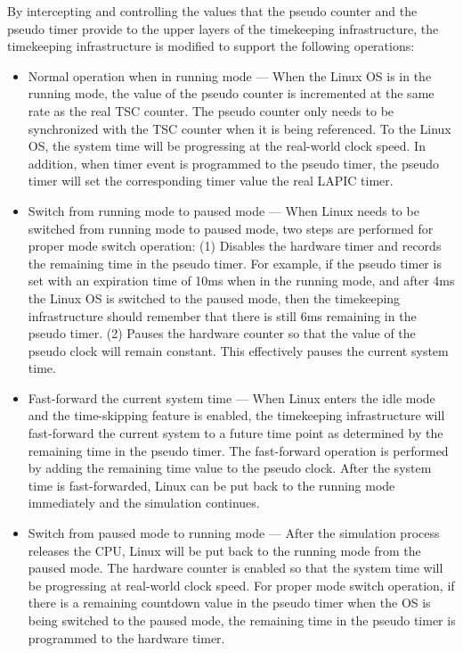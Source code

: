 By intercepting and controlling the values that the pseudo counter and the pseudo timer provide to the upper layers of the timekeeping infrastructure, the timekeeping infrastructure is modified to support the following operations:

\begin{itemize}
	\item Normal operation when in running mode --- When the Linux OS is in the running mode, the value of the pseudo counter is incremented at the same rate as the real TSC counter. The pseudo counter only needs to be synchronized with the TSC counter when it is being referenced. To the Linux OS, the system time will be progressing at the real-world clock speed. In addition, when timer event is programmed to the pseudo timer, the pseudo timer will set the corresponding timer value the real LAPIC timer.
	
	\item Switch from running mode to paused mode --- When Linux needs to be switched from running mode to paused mode, two steps are performed for proper mode switch operation: (1) Disables the hardware timer and records the remaining time in the pseudo timer. For example, if the pseudo timer is set with an expiration time of 10\si{\milli\second} when in the running mode, and after 4\si{\milli\second} the Linux OS is switched to the paused mode, then the timekeeping infrastructure should remember that there is still 6\si{\milli\second} remaining in the pseudo timer. (2) Pauses the hardware counter so that the value of the pseudo clock will remain constant. This effectively pauses the current system time.
	
	\item Fast-forward the current system time --- When Linux enters the idle mode and the time-skipping feature is enabled, the timekeeping infrastructure will fast-forward the current system to a future time point as determined by the remaining time in the pseudo timer. The fast-forward operation is performed by adding the remaining time value to the pseudo clock. After the system time is fast-forwarded, Linux can be put back to the running mode immediately and the simulation continues.
	
	\item Switch from paused mode to running mode --- After the simulation process releases the CPU, Linux will be put back to the running mode from the paused mode. The hardware counter is enabled so that the system time will be progressing at real-world clock speed. For proper mode switch operation, if there is a remaining countdown value in the pseudo timer when the OS is being switched to the paused mode, the remaining time in the pseudo timer is programmed to the hardware timer.
\end{itemize}

